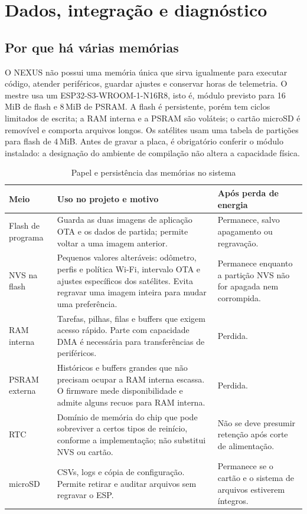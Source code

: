 \chapter{Dados, integração e diagnóstico}\label{cap:memorias_google}

\section{Por que há várias memórias}
O NEXUS não possui uma memória única que sirva igualmente para executar código, atender periféricos, guardar ajustes e conservar horas de telemetria. O mestre usa um ESP32-S3-WROOM-1-N16R8, isto é, módulo previsto para 16\,MiB de flash e 8\,MiB de PSRAM. A flash é persistente, porém tem ciclos limitados de escrita; a RAM interna e a PSRAM são voláteis; o cartão microSD é removível e comporta arquivos longos. Os satélites usam uma tabela de partições para flash de 4\,MiB. Antes de gravar a placa, é obrigatório conferir o módulo instalado: a designação do ambiente de compilação não altera a capacidade física.

\begin{table}[htbp]\centering\small
\caption{Papel e persistência das memórias no sistema}\label{tab:memorias_papel}
\begin{tabularx}{\textwidth}{@{}p{2.5cm}X X@{}}\toprule
Meio & Uso no projeto e motivo & Após perda de energia\\\midrule
Flash de programa & Guarda as duas imagens de aplicação OTA e os dados de partida; permite voltar a uma imagem anterior. & Permanece, salvo apagamento ou regravação.\\
NVS na flash & Pequenos valores alteráveis: odômetro, perfis e política Wi-Fi, intervalo OTA e ajustes específicos dos satélites. Evita regravar uma imagem inteira para mudar uma preferência. & Permanece enquanto a partição NVS não for apagada nem corrompida.\\
RAM interna & Tarefas, pilhas, filas e buffers que exigem acesso rápido. Parte com capacidade DMA é necessária para transferências de periféricos. & Perdida.\\
PSRAM externa & Históricos e buffers grandes que não precisam ocupar a RAM interna escassa. O firmware mede disponibilidade e admite alguns recuos para RAM interna. & Perdida.\\
RTC & Domínio de memória do chip que pode sobreviver a certos tipos de reinício, conforme a implementação; não substitui NVS ou cartão. & Não se deve presumir retenção após corte de alimentação.\\
microSD & CSVs, logs e cópia de configuração. Permite retirar e auditar arquivos sem regravar o ESP. & Permanece se o cartão e o sistema de arquivos estiverem íntegros.\\\bottomrule
\end{tabularx}
\end{table}

